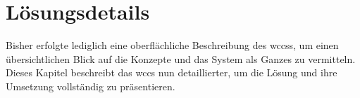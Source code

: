 \chapter{Lösungsdetails}
    \label{chapter:SolutionDetails}
    Bisher erfolgte lediglich eine oberflächliche Beschreibung des \glspl{wccs},
    um einen übersichtlichen Blick auf die Konzepte und das System als Ganzes
    zu vermitteln.
    Dieses Kapitel beschreibt das \gls{wccs} nun detaillierter,
    um die Lösung und ihre Umsetzung vollständig zu präsentieren.


    
    
    
    
    
    
    
    
    
